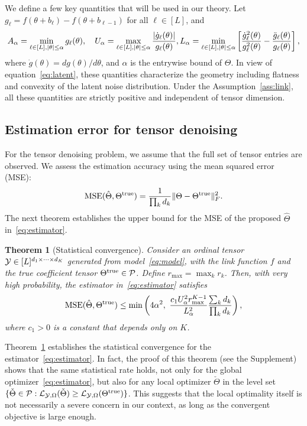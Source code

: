 \documentclass{article}
\theoremstyle{plain}
\newtheorem{thm}{Theorem}[section]
\theoremstyle{definition}
\begin{document}
We define a few key quantities that will be used in our theory. Let $g_\ell=f(\theta+b_\ell)-f(\theta+b_{\ell-1})$ for all $\ell\in[L]$, and
\begin{align}\label{eq:regular}
A_\alpha = \min_{\ell\in[L], |\theta|\leq \alpha} g_\ell(\theta),\quad  U_\alpha=\max_{\ell\in[L], |\theta|\leq \alpha } {|\dot{g}_\ell(\theta)|\over g_\ell(\theta)},
 L_\alpha = \min_{\ell\in[L], |\theta|\leq \alpha }\left[{\dot{g}_\ell^2 (\theta)\over g_\ell^2(\theta)} -{\ddot{g}_\ell(\theta)\over g_\ell(\theta)}\right],
\end{align}
where $\dot{g}(\theta)=dg(\theta)/d\theta$, and $\alpha$ is the entrywise bound of $\Theta$. In view of equation~\eqref{eq:latent}, these quantities characterize the geometry including flatness and convexity of the latent noise distribution. Under the Assumption~\ref{ass:link}, all these quantities are strictly positive and independent of tensor dimension.
\vspace{-.2cm}
\subsection{Estimation error for tensor denoising}\label{sec:denosing}
\vspace{-.2cm}
For the tensor denoising problem, we assume that the full set of tensor entries are observed. We assess the estimation accuracy using the mean squared error (MSE):
\[
\text{MSE}(\hat \Theta, \Theta^{\text{true}})={1\over \prod_k d_k}\lVert\Theta-\Theta^{\text{true}}\rVert_F^2.
\]
The next theorem establishes the upper bound for the MSE of the proposed $\hat \Theta$ in~\eqref{eq:estimator}.

\begin{thm}[Statistical convergence] \label{thm:rate}
Consider an ordinal tensor $\mathcal{Y}\in[L]^{d_1\times\dots\times d_K}$ generated from model~\eqref{eq:model}, with the link function $f$ and the true coefficient tensor $\Theta^{\text{true}}\in\mathcal{P}$. Define $r_{\max}=\max_k r_k$. Then, with very high probability, the estimator in~\eqref{eq:estimator} satisfies
\begin{equation}\label{eq:rate}
\mathrm{MSE}(\hat \Theta, \trueT) \leq \min\left( 4\alpha^2,\ {c_1  U^2_\alpha r_{\max}^{K-1}  \over  L^2_\alpha } {\sum_kd_k\over  \prod_k d_k} \right),
\end{equation}
where $c_1 >0$ is a constant that depends only on $K$.
\end{thm}
Theorem~\ref{thm:rate} establishes the statistical convergence for the estimator~\eqref{eq:estimator}. In fact, the proof of this theorem (see the Supplement) shows that the same statistical rate holds, not only for the global optimizer~\eqref{eq:estimator}, but also for any local optimizer $\check \Theta$ in the level set $\{\check\Theta\in\mathcal{P}: \mathcal{L}_{\mathcal{Y},\Omega}(\check\Theta)\geq \mathcal{L}_{\mathcal{Y},\Omega}(\Theta^{\text{true}})\}$. This suggests that the local optimality itself is not necessarily a severe concern in our context, as long as the convergent objective is large enough.
\end{document}
